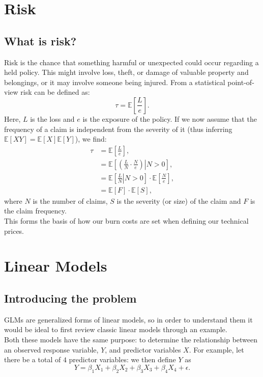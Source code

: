 \documentclass{article}
\begin{document}
\section{Risk}
\subsection{What is risk?}
Risk is the chance that something harmful or unexpected could occur regarding a held policy. This might involve loss, theft, or damage of valuable property and belongings, or it may involve someone being injured. From a statistical point-of-view risk can be defined as:
\begin{equation}
    \tau = \mathbb{E}\left[\frac{L}{e}\right].
\end{equation}
Here, $L$ is the loss and $e$ is the exposure of the policy. If we now assume that the frequency of a claim is independent from the severity of it (thus inferring $\mathbb{E}[XY] = \mathbb{E}[X]\mathbb{E}[Y]$), we find:
\begin{align}
    \tau &= \mathbb{E}\left[\frac{L}{e}\right], \\
    &= \mathbb{E}\left[ \left. \left( \frac{L}{N} \cdot\frac{N}{e} \right) \right\vert N>0 \right], \\
    &= \mathbb{E}\left[\left.\frac{L}{N}\right\vert N>0\right]\cdot\mathbb{E}\left[\frac{N}{e}\right], \\
    &= \mathbb{E}[F]\cdot\mathbb{E}[S],
\end{align}
where $N$ is the number of claims, $S$ is the severity (or size) of the claim and $F$ is the claim frequency.\\
This forms the basis of how our burn costs are set when defining our technical prices.

\section{Linear Models}
\subsection{Introducing the problem}
GLMs are generalized forms of linear models, so in order to understand them it would be ideal to first review classic linear models through an example. \\
Both these models have the same purpose: to determine the relationship between an observed response variable, $Y$, and predictor variables $X$. For example, let there be a total of $4$ predictor variables: we then define $Y$ as
\begin{equation}
    Y = \beta_1X_1 + \beta_2X_2 + \beta_3X_3 + \beta_4X_4 + \epsilon.
\end{equation}
\end{document}
